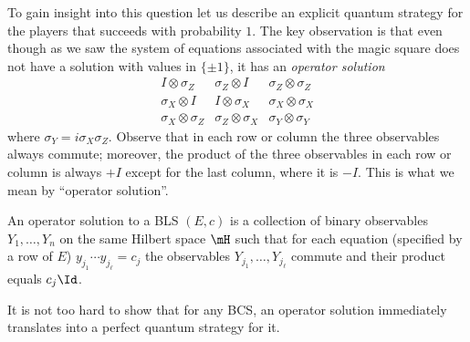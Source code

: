 To gain insight into this question let us describe an explicit quantum strategy for the players that succeeds with probability $1$. The key observation is that even though as we saw the system of equations associated with the magic square does not have a solution with values in $\{\pm 1\}$, it has an \emph{operator solution}
\begin{equation}\label{eq:opsol-ms}
 \begin{matrix} I\otimes \sigma_Z & \sigma_Z \otimes I & \sigma_Z \otimes \sigma_Z \\
\sigma_X \otimes I & I \otimes \sigma_X & \sigma_X\otimes \sigma_X\\
\sigma_X \otimes \sigma_Z & \sigma_Z \otimes \sigma_X & \sigma_Y \otimes \sigma_Y 
\end{matrix}
\end{equation}
where $\sigma_Y = i\sigma_X\sigma_Z$. 
Observe that in each row or column the three observables always commute; moreover, the product of the three observables in each row or column is always $+I$ except for the last column, where it is $-I$. This is what we mean by ``operator solution''.

\begin{definition}
An operator solution to a BLS $(E,c)$ is a collection of binary observables $Y_1,\ldots,Y_n$ on the same Hilbert space $\mH$ such that for each equation (specified by a row of $E$) $y_{j_1}\cdots y_{j_\ell} = c_j$ the observables $Y_{j_1},\ldots,Y_{j_\ell}$ commute and their product equals $c_j \Id$. 
\end{definition}

It is not too hard to show that for any BCS, an operator solution immediately translates into a perfect quantum strategy for it. 

